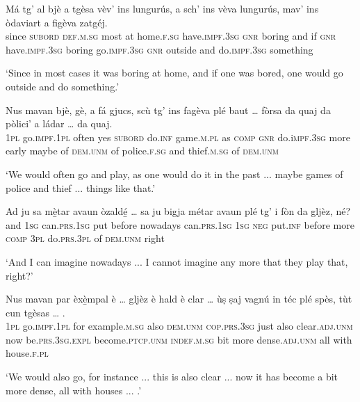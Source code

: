 \begin{linenumbers}
	\gll Má tg’ al bjè a tgèsa vèv’ ins lungurús, a sch’ ins vèva lungurús, mav’ ins òdaviart a figèva zatgéj.   \\
	since \textsc{subord} \textsc{def.m.sg} most at home.\textsc{f.sg} have.\textsc{impf.3sg} \textsc{gnr} boring and if \textsc{gnr} have.\textsc{impf.3sg} boring go.\textsc{impf.3sg} \textsc{gnr} outside and do.\textsc{impf.3sg} something\\
\end{linenumbers}
\medskip
\glt `Since in most cases it was boring at home, and if one was bored, one would go outside and do something.'
\medskip

\begin{linenumbers}
	\gll Nus mavan bjè, gè, a fá gjucs, scù tg’ ins fagèva plé baut … fòrsa da quaj da pòlici’ a ládar …  da quaj.   \\
	\textsc{1pl} go.\textsc{impf.1pl} often yes \textsc{subord} do.\textsc{inf} game.\textsc{m.pl} as \textsc{comp} \textsc{gnr} do.i\textsc{mpf.3sg} more early {} maybe of \textsc{dem.unm} of police.\textsc{f.sg} and thief.\textsc{m.sg} {} of \textsc{dem.unm}\\
\end{linenumbers}
\medskip
\glt `We would often go and play, as one would do it in the past ... maybe games of police and thief ... things like that.'
\medskip

\begin{linenumbers}
	\gll Ad ju sa mè̱tar avaun òzaldé̱ … sa ju bigja métar avaun plé tg’ i fòn da gljèz, né?    \\
	and \textsc{1sg} can.\textsc{prs.1sg} put before nowadays {} can.\textsc{prs.1sg} \textsc{1sg} \textsc{neg} put.\textsc{inf} before more \textsc{comp} \textsc{3pl} do.\textsc{prs.3pl} of \textsc{dem.unm} right \\
\end{linenumbers}
\medskip
\glt `And I can imagine nowadays ... I cannot imagine any more that they play that, right?'
\medskip

\begin{linenumbers}
	\gll Nus mavan par èxè̱mpal è … gljèz è hald è clar … ùṣ ṣaj vagnú in téc plé spès, tùt cun tgèsas … .   \\
	\textsc{1pl} go.\textsc{impf.1pl} for example.\textsc{m.sg} also {} \textsc{dem.unm} \textsc{cop.prs.3sg} just also clear.\textsc{adj.unm} {} now be.\textsc{prs.3sg.expl} become.\textsc{ptcp.unm} \textsc{indef.m.sg} bit more dense.\textsc{adj.unm} all with house.\textsc{f.pl } \\
\end{linenumbers}
\medskip
\glt `We would also go, for instance ... this is also clear ... now it has become a bit more dense, all with houses ... .'
\medskip


